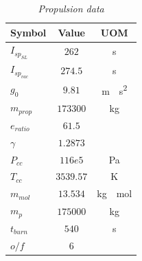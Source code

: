 \documentclass[12pt,fleqn,openany]{book} %
\begin{document}
\begin{table}[h]
	\centering
	\begin{tabular}{ l c c}
		\toprule
		Symbol									&Value 				&UOM	\\
		\midrule                                                                                                             
		$I_{sp_{SL}}  	$						&$262    $			&\si{\second}                       \\
		$I_{sp_{vac}} 	$						&$274.5  $			&\si{\second}                       \\
		$g_0			$							&$9.81   $		&	\si{\meter\over\second\squared}\\
		$m_{prop}   		$						&$173300 $		&	\si{\kilogram}					\\
		$e_{ratio}		$							&$61.5   $		&	\si{}                           \\
		$\gamma			$					    &$1.2873 $			&\si{}                               \\
		$P_{cc}			$						    &$116e5  $		&	\si{\pascal}                    \\
		$T_{cc}			$						    &$3539.57$		&	\si{\kelvin}                    \\
		$m_{mol}    		$						&$13.534 $		&	\si{\kilogram\over\mole}            \\
		$m_p      		$						&$175000 $			&\si{\kilogram}                      \\
		$t_{burn}   		$						&$540    $		&	\si{\second}                    \\
		$o/f$									&$6$  \\
		\bottomrule
	\end{tabular} 
	\caption{\emph{Propulsion data}}
	\label{tab:prdata}
\end{table}
\end{document}
